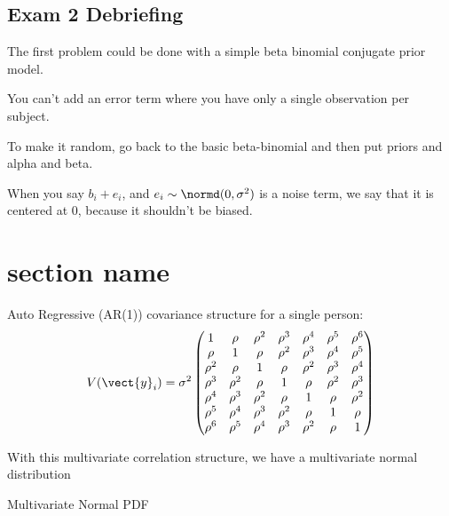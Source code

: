 \documentclass[12pt,letterpaper,oneside]{article}\usepackage{graphicx, color}
\newcommand{\dateTaken}{January 7, 2013}
\begin{document}
\renewcommand{\dateTaken}{April  4, 2013}
\daysep
\subsection{Exam 2 Debriefing} %
\label{sub:exam_2_debriefing}
The first problem could be done with a simple beta binomial conjugate prior model.

You can't add an error term where you have only a single observation per subject.

To make it random, go back to the basic beta-binomial and then put priors and alpha and beta.

When you say $b_{i}+e_{i}$, and $e_{i}\sim \normd(0,\sigma^{2})$ is a noise term, we say that it is centered at 0, because it shouldn't be biased.
\section{section name} %
\label{sec:section_name}
Auto Regressive (AR(1)) covariance structure for a single person:
\begin{align*}
V(\vect{y}_{i})=\sigma^{2}\begin{pmatrix}
    1        & \rho     & \rho^{2} & \rho^{3} & \rho^{4} & \rho^{5} & \rho^{6}\\
    \rho     & 1        & \rho     & \rho^{2} & \rho^{3} & \rho^{4} & \rho^{5}\\
    \rho^{2} & \rho     & 1        & \rho     & \rho^{2} & \rho^{3} & \rho^{4}\\
    \rho^{3} & \rho^{2} & \rho     & 1        & \rho     & \rho^{2} & \rho^{3}\\
    \rho^{4} & \rho^{3} & \rho^{2} & \rho     & 1        & \rho     & \rho^{2}\\
    \rho^{5} & \rho^{4} & \rho^{3} & \rho^{2} & \rho     & 1        & \rho    \\
    \rho^{6} & \rho^{5} & \rho^{4} & \rho^{3} & \rho^{2} & \rho     & 1       \\
\end{pmatrix}
\end{align*}

With this multivariate correlation structure, we have a multivariate normal distribution

Multivariate Normal PDF
\end{document}

